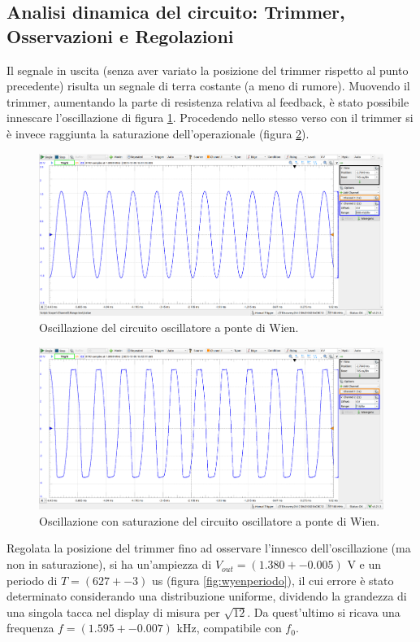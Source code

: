 \documentclass[10pt,a4paper]{article}
\begin{document}
\subsection{Analisi dinamica del circuito: Trimmer, Osservazioni e Regolazioni} 

Il segnale in uscita (senza aver variato la posizione del trimmer rispetto al punto precedente) risulta un segnale di terra costante (a meno di rumore).
Muovendo il trimmer, aumentando la parte di resistenza relativa al feedback, è stato possibile innescare l'oscillazione di figura \ref{fig:wienosc1}. Procedendo nello stesso verso con il trimmer si è invece raggiunta la saturazione dell'operazionale (figura \ref{fig:wiensaturazione}).
\begin{figure}[h]
    \begin{center}
    \includegraphics[width=0.7\linewidth]{wienosc1.png}
    \caption{\small Oscillazione del circuito oscillatore a ponte di Wien.}
    \label{fig:wienosc1}
    \end{center}
\end{figure}

\begin{figure}[h]
    \begin{center}
    \includegraphics[width=0.7\linewidth]{wiensaturazione.png}
    \caption{\small Oscillazione con saturazione del circuito oscillatore a ponte di Wien.}
    \label{fig:wiensaturazione}
    \end{center}
\end{figure}

Regolata la posizione del trimmer fino
ad osservare l'innesco dell'oscillazione (ma non in saturazione), si ha un'ampiezza di $V_{out} = (1.380 +- 0.005)$ V e un periodo di $T= (627+-3)$ us (figura \ref{fig:wyenperiodo}), il cui errore è stato determinato considerando una distribuzione uniforme, dividendo la grandezza di una singola tacca nel display di misura per $\sqrt{12}$. Da quest'ultimo si ricava una frequenza $f = (1.595+-0.007)$ kHz, compatibile con $f_0$.
\end{document}
